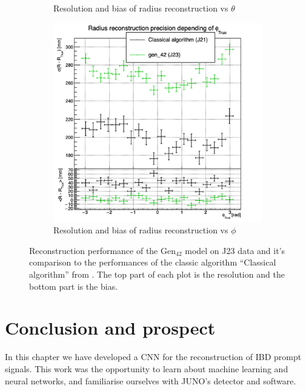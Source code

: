 \documentclass[../main.tex]{subfiles}
\begin{document}
{{\begin{figure}[ht]
\begin{subfigure}[t]{0.32\linewidth}
    \caption{Resolution and bias of radius reconstruction vs $\theta$}
    \label{fig:jcnn:vic_cnn:multi_vic_42_MSBvTTC}
  \end{subfigure}
  \begin{subfigure}[t]{0.32\linewidth}
    \centering
    \includegraphics[width=\linewidth]{images/jcnn/vic_cnn/multi_vic_42_MSBvPTC.png}
    \caption{Resolution and bias of radius reconstruction vs $\phi$}
    \label{fig:jcnn:vic_cnn:multi_vic_42_MSBvPTC}
  \end{subfigure}
  \caption{Reconstruction performance of the $\mathrm{Gen}_{42}$ model on J23 data and it's comparison to the performances of the classic algorithm ``Classical algorithm'' from \cite{lebrin_towards_2022}. The top part of each plot is the resolution and the bottom part is the bias.}
  \label{fig:jcnn:vic_cnn:gen42}
\end{figure}

\section{Conclusion and prospect}
\label{sec:jcnn:prospect}

In this chapter we have developed a CNN for the reconstruction of IBD prompt signals. This work was the opportunity to learn about machine learning and neural networks, and familiarise ourselves with JUNO's detector and software.

}}
\end{document}
